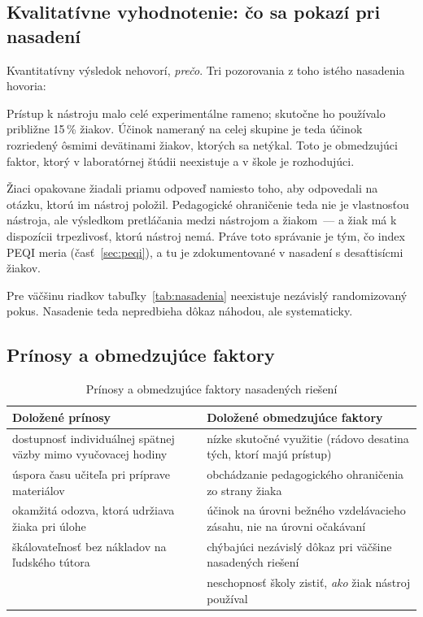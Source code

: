 \subsection{Kvalitatívne vyhodnotenie: čo sa pokazí pri nasadení}

Kvantitatívny výsledok nehovorí, \emph{prečo}. Tri pozorovania z toho istého nasadenia hovoria:

\begin{description}[leftmargin=0.6cm, nosep]
    \item[\textbf{Nástroj sa nepoužíva.}] Prístup k nástroju malo celé experimentálne rameno; skutočne ho používalo približne 15\,\% žiakov. Účinok nameraný na celej skupine je teda účinok rozriedený ôsmimi devätinami žiakov, ktorých sa netýkal. Toto je obmedzujúci faktor, ktorý v laboratórnej štúdii neexistuje a v škole je rozhodujúci.
    \item[\textbf{Žiaci obchádzajú sokratovskú vrstvu.}] Žiaci opakovane žiadali priamu odpoveď namiesto toho, aby odpovedali na otázku, ktorú im nástroj položil. Pedagogické ohraničenie teda nie je vlastnosťou nástroja, ale výsledkom pretláčania medzi nástrojom a žiakom~--- a žiak má k dispozícii trpezlivosť, ktorú nástroj nemá. Práve toto správanie je tým, čo index PEQI meria (časť~\ref{sec:peqi}), a tu je zdokumentované v nasadení s desaťtisícmi žiakov.
    \item[\textbf{Dôkaz chýba, nasadenie beží.}] Pre väčšinu riadkov tabuľky~\ref{tab:nasadenia} neexistuje nezávislý randomizovaný pokus. Nasadenie teda nepredbieha dôkaz náhodou, ale systematicky.
\end{description}

\subsection{Prínosy a obmedzujúce faktory}

\begin{table}[H]
\centering
\caption{Prínosy a obmedzujúce faktory nasadených riešení}
\label{tab:prinosy-obmedzenia}
\small
\begin{tabularx}{\textwidth}{@{}X X@{}}
\toprule
\textbf{Doložené prínosy} & \textbf{Doložené obmedzujúce faktory} \\
\midrule
dostupnosť individuálnej spätnej väzby mimo vyučovacej hodiny & nízke skutočné využitie (rádovo desatina tých, ktorí majú prístup) \\
úspora času učiteľa pri príprave materiálov & obchádzanie pedagogického ohraničenia zo strany žiaka \\
okamžitá odozva, ktorá udržiava žiaka pri úlohe & účinok na úrovni bežného vzdelávacieho zásahu, nie na úrovni očakávaní \\
škálovateľnosť bez nákladov na ľudského tútora & chýbajúci nezávislý dôkaz pri väčšine nasadených riešení \\
 & neschopnosť školy zistiť, \emph{ako} žiak nástroj používal \\
\bottomrule
\end{tabularx}
\end{table}

